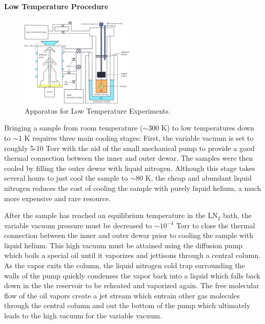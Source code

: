 \documentclass[prl,twocolumn,superscriptaddress,floatfix]{revtex4}
\begin{document}
\paragraph{Low Temperature Procedure}

\begin{figure}[ht]
    \begin{center}
    \includegraphics[width = 0.48\textwidth]{apparatus.pdf}
    \caption{Apparatus for Low Temperature Experiments.}
    \label{fig:apparatus}
    \end{center}
\end{figure}
 
Bringing a sample from room temperature ($\sim 300$ K) to low temperatures down to $\sim 1$ K requires three main cooling stages:
First, the variable vacuum is set to roughly 5-10 Torr
with the aid of the small mechanical pump to provide a good thermal connection between the inner and outer dewar.
The samples were then  cooled by filling the outer dewar with liquid nitrogen. 
Although this stage takes several hours to just cool the sample to $\sim 80$ K,
the cheap and abundant liquid nitrogen reduces the cost of cooling the sample with purely liquid helium, a much more expensive and rare resource.

After the sample has reached an equilibrium temperature in the LN$_2$ bath, the variable vacuum pressure must be decreased
to $\sim 10^{-4}$ Torr to close the thermal connection between the inner and outer dewar prior to cooling the sample with liquid helium.
This high vacuum must be attained using the diffusion pump which boils a special oil until it vaporizes and jettisons through a central column.
As the vapor exits the column, the liquid nitrogen cold trap surrounding the walls of the pump quickly condenses the vapor back into a liquid which falls back down in the the
reservoir to be reheated and vaporized again. The free molecular flow of the oil vapors create a jet stream which entrain other gas molecules
through the central column and out the bottom of the pump which ultimately leads to the high vacuum for the variable vacuum.
\end{document}
